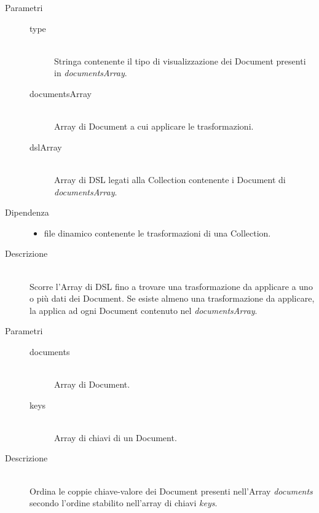 \begin{description}
\begin{mldescription}
	 \hfill 
		\begin{description}
			\item[Parametri] \hfill
				\begin{description}
					\item[type] \hfill \\
						Stringa contenente il tipo di visualizzazione dei Document presenti in 										\textit{documentsArray}.
					\item[documentsArray] \hfill \\
						Array di Document a cui applicare le trasformazioni.
					\item[dslArray] \hfill \\
						Array di DSL legati alla Collection contenente i Document di \textit{documentsArray}.
				\end{description}
			\item[Dipendenza] \hfill 
				\begin{itemize}
					\item file dinamico contenente le trasformazioni di una Collection.
				\end{itemize}
			\item[Descrizione] \hfill \\	
			Scorre l'Array di DSL fino a trovare una trasformazione da applicare a uno o più dati dei Document. Se esiste almeno una trasformazione da applicare, la applica ad ogni Document contenuto nel \textit{documentsArray}.							
		\end{description}
		
	 \hfill 
		\begin{description}
			\item[Parametri] \hfill
				\begin{description}
					\item[documents] \hfill \\
					Array di Document.
					\item[keys] \hfill \\
					Array di chiavi di un Document.
				\end{description}
			\item[Descrizione] \hfill \\
			Ordina le coppie chiave-valore dei Document presenti nell'Array \textit{documents} secondo 
			l'ordine stabilito nell'array di chiavi \textit{keys}.
		\end{description}			
	

\end{mldescription}
\end{description}

